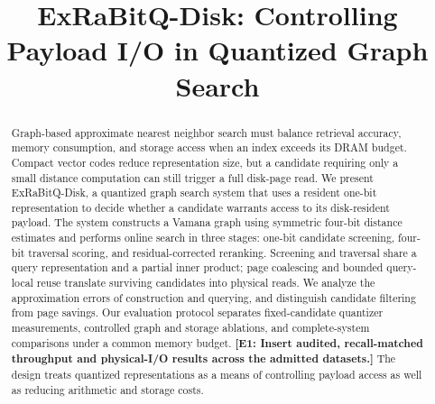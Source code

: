 \documentclass[sigconf,anonymous]{acmart}
\title{ExRaBitQ-Disk: Controlling Payload I/O in Quantized Graph Search}
\begin{document}
\begin{abstract}
Graph-based approximate nearest neighbor search must balance retrieval accuracy, memory consumption, and storage access when an index exceeds its DRAM budget. Compact vector codes reduce representation size, but a candidate requiring only a small distance computation can still trigger a full disk-page read. We present ExRaBitQ-Disk, a quantized graph search system that uses a resident one-bit representation to decide whether a candidate warrants access to its disk-resident payload. The system constructs a Vamana graph using symmetric four-bit distance estimates and performs online search in three stages: one-bit candidate screening, four-bit traversal scoring, and residual-corrected reranking. Screening and traversal share a query representation and a partial inner product; page coalescing and bounded query-local reuse translate surviving candidates into physical reads. We analyze the approximation errors of construction and querying, and distinguish candidate filtering from page savings. Our evaluation protocol separates fixed-candidate quantizer measurements, controlled graph and storage ablations, and complete-system comparisons under a common memory budget. \textbf{[E1: Insert audited, recall-matched throughput and physical-I/O results across the admitted datasets.]} The design treats quantized representations as a means of controlling payload access as well as reducing arithmetic and storage costs.
\end{abstract}
\maketitle
\newcommand{\diskfigure}[1]{}



\end{document}
